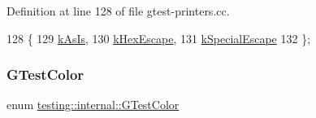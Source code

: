 Definition at line 128 of file gtest-\/printers.\+cc.


\begin{DoxyCode}
128                 \{
129   \hyperlink{namespacetesting_1_1internal_ae2ef98247c76a50cdc80ceb4a6c81793af7038866be92e9978360b831e376ffaa}{kAsIs},
130   \hyperlink{namespacetesting_1_1internal_ae2ef98247c76a50cdc80ceb4a6c81793aebfa5293302338a8e8678744c103f113}{kHexEscape},
131   \hyperlink{namespacetesting_1_1internal_ae2ef98247c76a50cdc80ceb4a6c81793ae1211108e9f35f891d9951da64794d03}{kSpecialEscape}
132 \};
\end{DoxyCode}
\mbox{\label{namespacetesting_1_1internal_a648c1bc94c2ef9e868ff3f9dff0f9c4e}} 
\subsubsection{\texorpdfstring{G\+Test\+Color}{GTestColor}}
{\footnotesize\ttfamily enum \hyperlink{namespacetesting_1_1internal_a648c1bc94c2ef9e868ff3f9dff0f9c4e}{testing\+::internal\+::\+G\+Test\+Color}}

